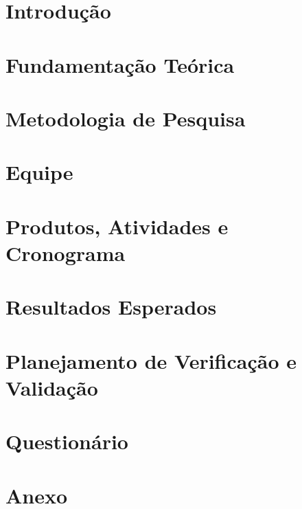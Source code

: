 \section{Introdução} %
\label{sec:introdu_o}
 

\section{Fundamentação Teórica} %
\label{sec:fundamentacao}
 

\section{Metodologia de Pesquisa} %
\label{sec:metodologia}
 

\section{Equipe} %
\label{sec:equipe}
 

\section{Produtos, Atividades e Cronograma} %
\label{sec:produtos}
 

\section{Resultados Esperados} %
\label{sec:resultados_esperados}
 

\section{Planejamento de Verificação e Validação} %
\label{sec:planejamento}
 

\section{Questionário} %
\label{sec:questionario}
 

\section{Anexo} %
\label{sec:Anexo}
 
